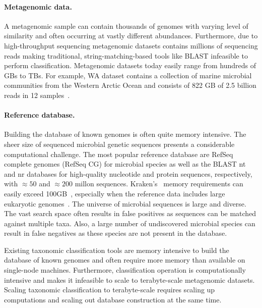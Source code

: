 \paragraph{Metagenomic data.}
A metagenomic sample can contain thousands of genomes with varying level of similarity and often occurring at vastly different abundances. Furthermore, due to high-throughput sequencing metagenomic datasets contains millions of sequencing reads making traditional, string-matching-based tools like BLAST infeasible to perform classification. Metagenomic datasets today easily range from hundreds of GBs to TBs. For example, WA dataset contains a collection of marine microbial communities from the Western Arctic Ocean and consists of 822 GB of 2.5 billion reads in 12 samples~\cite{hofmeyr2020terabase}.

\paragraph{Reference database.} 
Building the database of known genomes is often quite memory intensive.
The sheer size of sequenced microbial genetic sequences presents a considerable computational challenge.
The most popular reference database are RefSeq complete genomes (RefSeq CG) for microbial species as well as the BLAST nt and nr databases for high-quality nucleotide and protein sequences, respectively, with $\approx50$ and $\approx200$ millon sequences. 
Kraken's~\cite{wood2014kraken} memory requirements can easily exceed 100GB~\cite{simon2019benchmarking}, especially when the reference data includes large eukaryotic genomes~\cite{meiser2017sequencing, knutson2017porcine}.
%
The universe of microbial sequences is large and diverse. The vast search space often results in false positives as sequences can be matched against multiple taxa. Also, a large number of undiscovered microbial species can result in false negatives as these species are not present in the database.

\begin{rproblem}
Existing taxonomic classification tools are memory intensive to build the database of known genomes and often require more memory than available on single-node machines. Furthermore, classification operation is computationally intensive and makes it infeasible to scale to terabyte-scale metagenomic datasets. 
 Scaling taxonomic classification to terabyte-scale requires scaling up computations and scaling out database construction at the same time.
\label{rprob:peppermint}
\end{rproblem}

